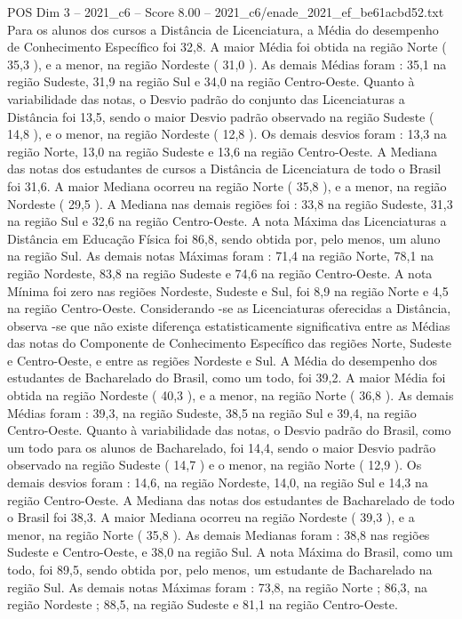\begin{textsample}{POS Dim 3 – 2021\_c6 – Score 8.00 – 2021\_c6/enade\_2021\_ef\_be61acbd52.txt}
Para os alunos dos cursos a Distância de Licenciatura, a Média do desempenho de Conhecimento Específico foi 32,8.
A maior Média foi obtida na região Norte ( 35,3 ), e a menor, na região Nordeste ( 31,0 ).
As demais Médias foram : 35,1 na região Sudeste, 31,9 na região Sul e 34,0 na região Centro-Oeste.
Quanto à variabilidade das notas, o Desvio padrão do conjunto das Licenciaturas a Distância foi 13,5, sendo o maior Desvio padrão observado na região Sudeste ( 14,8 ), e o menor, na região Nordeste ( 12,8 ).
Os demais desvios foram : 13,3 na região Norte, 13,0 na região Sudeste e 13,6 na região Centro-Oeste.
A Mediana das notas dos estudantes de cursos a Distância de Licenciatura de todo o Brasil foi 31,6.
A maior Mediana ocorreu na região Norte ( 35,8 ), e a menor, na região Nordeste ( 29,5 ).
A Mediana nas demais regiões foi : 33,8 na região Sudeste, 31,3 na região Sul e 32,6 na região Centro-Oeste.
A nota Máxima das Licenciaturas a Distância em Educação Física foi 86,8, sendo obtida por, pelo menos, um aluno na região Sul.
As demais notas Máximas foram : 71,4 na região Norte, 78,1 na região Nordeste, 83,8 na região Sudeste e 74,6 na região Centro-Oeste.
A nota Mínima foi zero nas regiões Nordeste, Sudeste e Sul, foi 8,9 na região Norte e 4,5 na região Centro-Oeste.
Considerando -se as Licenciaturas oferecidas a Distância, observa -se que não existe diferença estatisticamente significativa entre as Médias das notas do Componente de Conhecimento Específico das regiões Norte, Sudeste e Centro-Oeste, e entre as regiões Nordeste e Sul.
A Média do desempenho dos estudantes de Bacharelado do Brasil, como um todo, foi 39,2.
A maior Média foi obtida na região Nordeste ( 40,3 ), e a menor, na região Norte ( 36,8 ).
As demais Médias foram : 39,3, na região Sudeste, 38,5 na região Sul e 39,4, na região Centro-Oeste.
Quanto à variabilidade das notas, o Desvio padrão do Brasil, como um todo para os alunos de Bacharelado, foi 14,4, sendo o maior Desvio padrão observado na região Sudeste ( 14,7 ) e o menor, na região Norte ( 12,9 ).
Os demais desvios foram : 14,6, na região Nordeste, 14,0, na região Sul e 14,3 na região Centro-Oeste.
A Mediana das notas dos estudantes de Bacharelado de todo o Brasil foi 38,3.
A maior Mediana ocorreu na região Nordeste ( 39,3 ), e a menor, na região Norte ( 35,8 ).
As demais Medianas foram : 38,8 nas regiões Sudeste e Centro-Oeste, e 38,0 na região Sul.
A nota Máxima do Brasil, como um todo, foi 89,5, sendo obtida por, pelo menos, um estudante de Bacharelado na região Sul.
As demais notas Máximas foram : 73,8, na região Norte ; 86,3, na região Nordeste ; 88,5, na região Sudeste e 81,1 na região Centro-Oeste.

\end{textsample}
